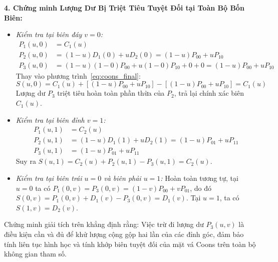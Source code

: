 \textbf{4. Chứng minh Lượng Dư Bị Triệt Tiêu Tuyệt Đối tại Toàn Bộ Bốn Biên:}
\begin{itemize}
    \item \textit{Kiểm tra tại biên đáy $v = 0$:}
    \begin{align}
    P_1(u, 0) &= C_1(u) \\
    P_2(u, 0) &= (1 - u) D_1(0) + u D_2(0) = (1 - u) P_{00} + u P_{10} \\
    P_3(u, 0) &= (1 - u)(1 - 0) P_{00} + u(1 - 0) P_{10} + 0 + 0 = (1 - u) P_{00} + u P_{10}
    \end{align}
    Thay vào phương trình~\eqref{eq:coons_final}:
    \begin{equation}
    S(u, 0) = C_1(u) + \left[ (1 - u) P_{00} + u P_{10} \right] - \left[ (1 - u) P_{00} + u P_{10} \right] = C_1(u)
    \end{equation}
    Lượng dư $P_3$ triệt tiêu hoàn toàn phần thừa của $P_2$, trả lại chính xác biên $C_1(u)$.
    
    \item \textit{Kiểm tra tại biên đỉnh $v = 1$:}
    \begin{align}
    P_1(u, 1) &= C_2(u) \\
    P_2(u, 1) &= (1 - u) D_1(1) + u D_2(1) = (1 - u) P_{01} + u P_{11} \\
    P_3(u, 1) &= (1 - u) P_{01} + u P_{11}
    \end{align}
    Suy ra $S(u, 1) = C_2(u) + P_2(u, 1) - P_3(u, 1) = C_2(u)$.
    
    \item \textit{Kiểm tra tại biên trái $u = 0$ và biên phải $u = 1$:} Hoàn toàn tương tự, tại $u = 0$ ta có $P_1(0, v) = P_3(0, v) = (1 - v) P_{00} + v P_{01}$, do đó $S(0, v) = P_1(0, v) + D_1(v) - P_3(0, v) = D_1(v)$. Tại $u = 1$, ta có $S(1, v) = D_2(v)$.
\end{itemize}

Chứng minh giải tích trên khẳng định rằng: Việc trừ đi lượng dư $P_3(u, v)$ là điều kiện cần và đủ để khử lượng cộng gộp hai lần của các đỉnh góc, đảm bảo tính liên tục hình học và tính khớp biên tuyệt đối của mặt vá Coons trên toàn bộ không gian tham số.
